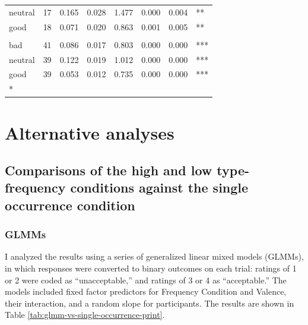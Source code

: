 \documentclass[
]{article}
\begin{document}
\begin{longtable}[t]{lrrrrrrl}
\hspace{1em}neutral & 17 & 0.165 & 0.028 & 1.477 & 0.000 & 0.004 & **\\
\hspace{1em}good & 18 & 0.071 & 0.020 & 0.863 & 0.001 & 0.005 & **\\
\addlinespace[0.3em]
\multicolumn{8}{l}{\textbf{Prevalence - Testable}}\\
\hspace{1em}bad & 41 & 0.086 & 0.017 & 0.803 & 0.000 & 0.000 & ***\\
\hspace{1em}neutral & 39 & 0.122 & 0.019 & 1.012 & 0.000 & 0.000 & ***\\
\hspace{1em}good & 39 & 0.053 & 0.012 & 0.735 & 0.000 & 0.000 & ***\\*
\end{longtable}

\clearpage

\section{Alternative analyses}\label{app:alternative-analyses}

\subsection{Comparisons of the high and low type-frequency conditions against the single occurrence condition}\label{comparisons-of-the-high-and-low-type-frequency-conditions-against-the-single-occurrence-condition-2}

\subsubsection{GLMMs}\label{glmms}

I analyzed the results using a series of generalized linear mixed models (GLMMs), in which responses were converted to binary outcomes on each trial: ratings of 1 or 2 were coded as ``unacceptable,'' and ratings of 3 or 4 as ``acceptable.'' The models included fixed factor predictors for Frequency Condition and Valence, their interaction, and a random slope for participants. The results are shown in Table \ref{tab:glmm-vs-single-occurrence-print}.
\end{document}
